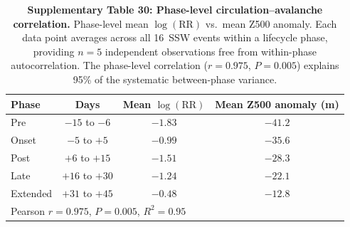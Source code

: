 \begin{table}[!ht]
\centering
\caption{\textbf{Supplementary Table 30: Phase-level circulation--avalanche correlation.}
Phase-level mean $\log(\mathrm{RR})$ vs.\ mean Z500 anomaly. Each data point averages across all 16~SSW events within a lifecycle phase, providing $n = 5$ independent observations free from within-phase autocorrelation. The phase-level correlation ($r = 0.975$, $P = 0.005$) explains 95\% of the systematic between-phase variance.}
\label{tab:phase_correlation}
\small
\begin{tabular}{lccc}
\toprule
Phase & Days & Mean $\log(\mathrm{RR})$ & Mean Z500 anomaly (m) \\
\midrule
Pre & $-15$ to $-6$ & $-1.83$ & $-41.2$ \\
Onset & $-5$ to $+5$ & $-0.99$ & $-35.6$ \\
Post & $+6$ to $+15$ & $-1.51$ & $-28.3$ \\
Late & $+16$ to $+30$ & $-1.24$ & $-22.1$ \\
Extended & $+31$ to $+45$ & $-0.48$ & $-12.8$ \\
\midrule
\multicolumn{4}{l}{Pearson $r = 0.975$, $P = 0.005$, $R^2 = 0.95$} \\
\bottomrule
\end{tabular}
\end{table}

